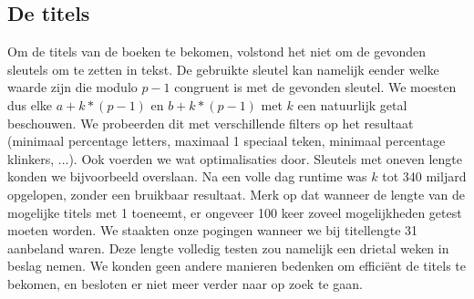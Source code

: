 \subsection{De titels}
Om de titels van de boeken te bekomen, volstond het niet om de gevonden sleutels om te zetten in tekst. De gebruikte sleutel kan namelijk eender welke waarde zijn die modulo $p-1$ congruent is met de gevonden sleutel. We moesten dus elke $a + k * (p-1)$ en $b + k * (p-1)$ met $k$ een natuurlijk getal beschouwen. We probeerden dit met verschillende filters op het resultaat (minimaal percentage letters, maximaal 1 speciaal teken, minimaal percentage klinkers, ...). Ook voerden we wat optimalisaties door. Sleutels met oneven lengte konden we bijvoorbeeld overslaan. Na een volle dag runtime was $k$ tot 340 miljard opgelopen, zonder een bruikbaar resultaat. Merk op dat wanneer de lengte van de mogelijke titels met 1 toeneemt, er ongeveer 100 keer zoveel mogelijkheden getest moeten worden. We staakten onze pogingen wanneer we bij titellengte 31 aanbeland waren. Deze lengte volledig testen zou namelijk een drietal weken in beslag nemen. We konden geen andere manieren bedenken om effici\"ent de titels te bekomen, en besloten er niet meer verder naar op zoek te gaan.
